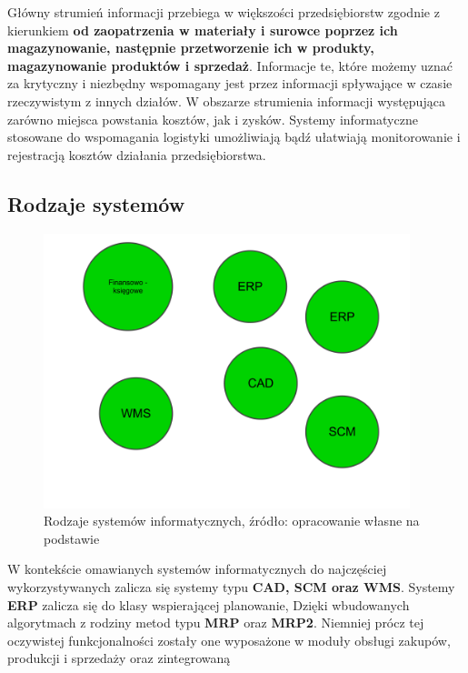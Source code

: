 		Główny strumień informacji przebiega w większości przedsiębiorstw zgodnie z kierunkiem 
		\textbf{od zaopatrzenia w materiały i surowce poprzez ich magazynowanie, następnie przetworzenie ich 
		w produkty, magazynowanie produktów i sprzedaż}. Informacje te, które możemy uznać za krytyczny
		i niezbędny wspomagany jest przez informacji spływające w czasie rzeczywistym z innych działów. 
		W obszarze strumienia informacji występująca zarówno miejsca powstania kosztów, jak i zysków. 
		Systemy informatyczne stosowane do wspomagania logistyki umożliwiają bądź ułatwiają monitorowanie
		i rejestracją kosztów działania przedsiębiorstwa. 
		
	\subsection{Rodzaje systemów}
		\begin{figure}[h]
			\begin{center}
				\includegraphics[width=0.95\textwidth]{images/is_logistic}
			\end{center}
			\caption[Rodzaje systemów informatycznych]{
				Rodzaje systemów informatycznych, źródło: opracowanie własne na podstawie \cite{IDL}
			}
		\end{figure}
		W kontekście omawianych systemów informatycznych do najczęściej wykorzystywanych zalicza się systemy typu
		\textbf{CAD, SCM oraz WMS}. Systemy \textbf{ERP} zalicza się do klasy wspierającej planowanie, Dzięki 
		wbudowanych algorytmach z rodziny metod typu \textbf{MRP} oraz \textbf{MRP2}. Niemniej prócz tej oczywistej
		funkcjonalności zostały one wyposażone w moduły obsługi zakupów, produkcji i sprzedaży oraz zintegrowaną
